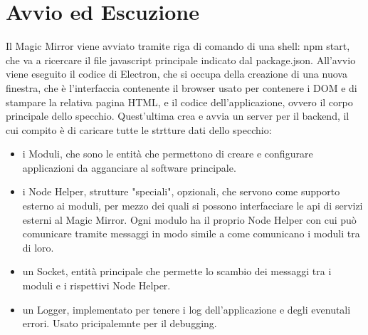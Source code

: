 \section{Avvio ed Escuzione}
Il Magic Mirror viene avviato tramite riga di comando di una shell: npm start, che va a ricercare
il file javascript principale indicato dal package.json.
All'avvio viene eseguito il codice di Electron, che si occupa della creazione di una nuova finestra, che è l'interfaccia contenente il browser
usato per contenere i DOM e di stampare la relativa pagina HTML, e il codice dell'applicazione, ovvero il corpo principale dello specchio.
Quest'ultima crea e avvia un server per il backend,
il cui compito è di caricare tutte le strtture dati dello specchio:
\begin{itemize}
\item i Moduli, che sono le entità che permettono di creare e configurare applicazioni da agganciare al software principale.
\item i Node Helper, strutture "speciali", opzionali, che servono come supporto esterno ai moduli, per mezzo dei quali si possono interfacciare le api di servizi
esterni al Magic Mirror. Ogni modulo ha il proprio Node Helper con cui può comunicare tramite messaggi in modo simile a come comunicano i moduli tra di loro.
\item un Socket, entità principale che permette lo scambio dei messaggi tra i moduli e i rispettivi Node Helper.
\item un Logger, implementato per tenere i log dell'applicazione e degli evenutali errori. Usato pricipalemnte per il debugging.\\[2\baselineskip]
\end{itemize}
